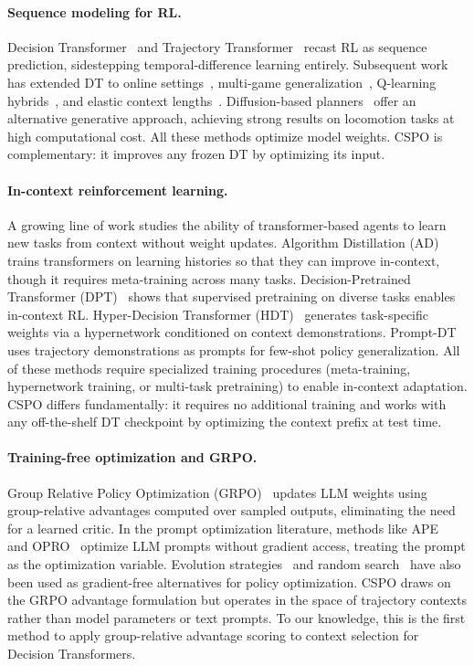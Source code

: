 \documentclass{article}
\newcommand{\cspo}{\textsc{CSPO}}
\begin{document}
\paragraph{Sequence modeling for RL.}
Decision Transformer~\citep{chen2021decision} and Trajectory Transformer~\citep{janner2021offline} recast RL as sequence prediction, sidestepping temporal-difference learning entirely. Subsequent work has extended DT to online settings~\citep{zheng2022online}, multi-game generalization~\citep{lee2022multigame}, Q-learning hybrids~\citep{yamagata2023qlearning}, and elastic context lengths~\citep{wu2024elastic}. Diffusion-based planners~\citep{janner2022planning, ajay2023conditional, chi2023diffusion} offer an alternative generative approach, achieving strong results on locomotion tasks at high computational cost. All these methods optimize model weights. \cspo{} is complementary: it improves any frozen DT by optimizing its input.

\paragraph{In-context reinforcement learning.}
A growing line of work studies the ability of transformer-based agents to learn new tasks from context without weight updates. Algorithm Distillation (AD)~\citep{laskin2022incontext} trains transformers on learning histories so that they can improve in-context, though it requires meta-training across many tasks. Decision-Pretrained Transformer (DPT)~\citep{lee2024supervised} shows that supervised pretraining on diverse tasks enables in-context RL. Hyper-Decision Transformer (HDT)~\citep{xu2023hdt} generates task-specific weights via a hypernetwork conditioned on context demonstrations. Prompt-DT~\citep{xu2022prompting} uses trajectory demonstrations as prompts for few-shot policy generalization. All of these methods require specialized training procedures (meta-training, hypernetwork training, or multi-task pretraining) to enable in-context adaptation. \cspo{} differs fundamentally: it requires no additional training and works with any off-the-shelf DT checkpoint by optimizing the context prefix at test time.

\paragraph{Training-free optimization and GRPO.}
Group Relative Policy Optimization (GRPO)~\citep{shao2024deepseekmath, guo2025deepseek} updates LLM weights using group-relative advantages computed over sampled outputs, eliminating the need for a learned critic. In the prompt optimization literature, methods like APE~\citep{zhou2023large} and OPRO~\citep{yang2024large} optimize LLM prompts without gradient access, treating the prompt as the optimization variable. Evolution strategies~\citep{salimans2017evolution, hansen2003reducing} and random search~\citep{mania2018simple} have also been used as gradient-free alternatives for policy optimization. \cspo{} draws on the GRPO advantage formulation but operates in the space of trajectory contexts rather than model parameters or text prompts. To our knowledge, this is the first method to apply group-relative advantage scoring to context selection for Decision Transformers.
\end{document}
